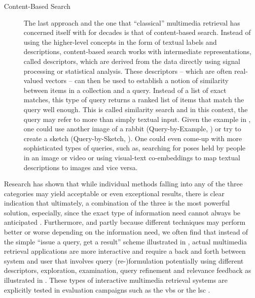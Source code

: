 \begin{description}
    \item[Content-Based Search] The last approach and the one that ``classical'' multimedia retrieval has concerned itself with for decades is that of content-based search. Instead of using the higher-level concepts in the form of textual labels and descriptions, content-based search works with intermediate representations, called descriptors, which are derived from the data directly using signal processing or statistical analysis. These descriptors -- which are often real-valued vectors \cite{Zezula:2006Similarity} -- can then be used to establish a notion of similarity between items in a collection and a query. Instead of a list of exact matches, this type of query returns a ranked list of items that match the query well enough. This is called similarity search \cite{Blanken:2007multimedia} and in this context, the query may refer to more than simply textual input. Given the example in , one could use another image of a rabbit (Query-by-Example, \cite{Kelly:1995Query}) or try to create a sketch (Query-by-Sketch, \cite{Sciascio:1999Content}). One could even come-up with more sophisticated types of queries, such as, searching for poses held by people in an image or video \cite{Heller:2022Multi} or using visual-text co-embeddings \cite{Radford:2021Learning,Spiess:2022Multi} to map textual descriptions to images and vice versa.
\end{description}

Research has shown that while individual methods falling into any of the three categories may yield acceptable or even exceptional results, there is clear indication that ultimately, a combination of the three is the most powerful solution, especially, since the exact type of information need cannot always be anticipated \cite{Rossetto:2020Interactive}. Furthermore, and partly because different techniques may perform better or worse depending on the information need, we often find that instead of the simple ``issue a query, get a result'' scheme illustrated in , actual multimedia retrieval applications are more interactive and require a back and forth between system and user \cite{Lokovc:2022Task} that involves query (re-)formulation potentially using different descriptors, exploration, examination, query refinement and relevance feedback \cite{Lokovc:2019Interactive,Gurrin:2019Invited} as illustrated in . These types of interactive multimedia retrieval systems are explicitly tested in evaluation campaigns such as the \acrfull{vbs} \cite{Schoeffmann:2019Video} or the \acrfull{lsc} \cite{Gurrin:2021Introduction}.

